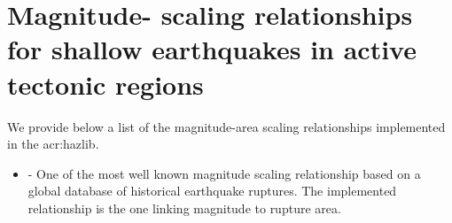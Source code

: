 \label{sec:msr_list}

\section[Relationships for shallow earthquakes in active tectonic regions]{Magnitude-
scaling relationships for shallow earthquakes in active tectonic regions}
We provide below a list of the magnitude-area scaling relationships 
implemented in the \gls{acr:hazlib}.
\begin{itemize}
    \item \cite{wells1994} - One of the most well known magnitude scaling
        relationship based on a global database of historical earthquake 
        ruptures. The implemented relationship is the one linking magnitude 
        to rupture area.
\end{itemize}
%
%
